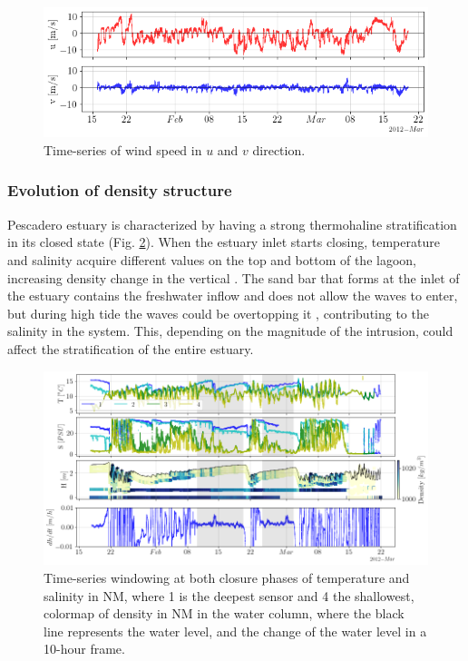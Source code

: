 \documentclass[tesis.tex]{subfiles}
\begin{document}
\begin{figure}[h!]
    \centering
    \includegraphics[width=\textwidth]{Imagenes/wind_vel.png}
    \caption{Time-series of wind speed in $u$ and $v$ direction.}
    \label{fig:windvel}
\end{figure}

\subsubsection{Evolution of density structure}

Pescadero estuary is characterized by having a strong thermohaline stratification in its closed state (Fig. \ref{fig:saltemp}). When the estuary inlet starts closing, temperature and salinity acquire different values on the top and bottom of the lagoon, increasing density change in the vertical \citep{largier2015}. The sand bar that forms at the inlet of the estuary contains the freshwater inflow and does not allow the waves to enter, but during high tide the waves could be overtopping it \citep{laudier2011measured}, contributing to the salinity in the system. This, depending on the magnitude of the intrusion, could affect the stratification of the entire estuary.\\

\begin{figure}[h!]
    \centering
    \includegraphics[scale=0.5]{Imagenes/saltemp.png}
    \caption{Time-series windowing at both closure phases of temperature and salinity in NM, where 1 is the deepest sensor and 4 the shallowest, colormap of density in NM in the water column, where the black line represents the water level, and the change of the water level in a 10-hour frame.}
    \label{fig:saltemp}
\end{figure}
\end{document}
